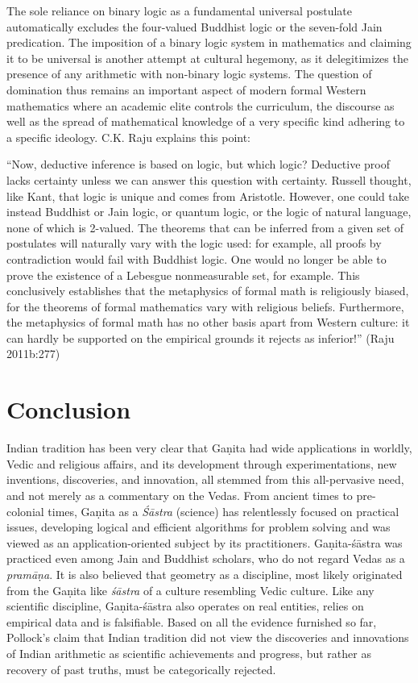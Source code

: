 The sole reliance on binary logic as a fundamental universal postulate automatically excludes the four-valued Buddhist logic or the seven-fold Jain predication. The imposition of a binary logic system in mathematics and claiming it to be universal is another attempt at cultural hegemony, as it delegitimizes the presence of any arithmetic with non-binary logic systems. The question of domination thus remains an important aspect of modern formal Western mathematics where an academic elite controls the curriculum, the discourse as well as the spread of mathematical knowledge of a very specific kind adhering to a specific ideology. C.K. Raju explains this point: 
\begin{myquote}
``Now, deductive inference is based on logic, but which logic? Deductive proof lacks certainty unless we can answer this question with certainty. Russell thought, like Kant, that logic is unique and comes from Aristotle. However, one could take instead Buddhist or Jain logic, or quantum logic, or the logic of natural language, none of which is 2-valued. The theorems that can be inferred from a given set of postulates will naturally vary with the logic used: for example, all proofs by contradiction would fail with Buddhist logic. One would no longer be able to prove the existence of a Lebesgue nonmeasurable set, for example. This conclusively establishes that the metaphysics of formal math is religiously biased, for the theorems of formal mathematics vary with religious beliefs. Furthermore, the metaphysics of formal math has no other basis apart from Western culture: it can hardly be supported on the empirical grounds it rejects as inferior!''
\hfill (Raju 2011b:277)
\end{myquote}

\medskip

\section*{Conclusion}

Indian tradition has been very clear that Gaṇita had wide applications in worldly, Vedic and religious affairs, and its development through experimentations, new inventions, discoveries, and innovation, all stemmed from this all-pervasive need, and not merely as a commentary on the Vedas. From ancient times to pre-colonial times, Gaṇita as a {\sl Śāstra} (science) has relentlessly focused on practical issues, developing logical and efficient algorithms for problem solving and was viewed as an application-oriented subject by its practitioners. Gaṇita-śāstra was practiced even among Jain and Buddhist scholars, who do not regard Vedas as a {\sl pramāṇa}. It is also believed that geometry as a discipline, most likely originated from the Gaṇita like {\sl śāstra} of a culture resembling Vedic culture. Like any scientific discipline, Gaṇita-śāstra also operates on real entities, relies on empirical data and is falsifiable. Based on all the evidence furnished so far, Pollock’s claim that Indian tradition did not view the discoveries and innovations of Indian arithmetic as scientific achievements and progress, but rather as recovery of past truths, must be categorically rejected.

